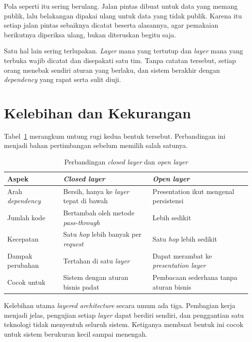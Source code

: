 Pola seperti itu sering berulang. Jalan pintas dibuat untuk data yang memang
publik, lalu belakangan dipakai ulang untuk data yang tidak publik. Karena itu
setiap jalan pintas sebaiknya dicatat beserta alasannya, agar pemakaian
berikutnya diperiksa ulang, bukan diteruskan begitu saja.


Satu hal lain sering terlupakan. \textit{Layer} mana yang tertutup dan \textit{layer} mana
yang terbuka wajib dicatat dan disepakati satu tim. Tanpa catatan tersebut,
setiap orang menebak sendiri aturan yang berlaku, dan sistem berakhir dengan
\textit{dependency} yang rapat serta sulit diuji.

\section{Kelebihan dan Kekurangan}

Tabel~\ref{tab:untung-rugi} merangkum untung rugi kedua bentuk tersebut.
Perbandingan ini menjadi bahan pertimbangan sebelum memilih salah satunya.

\begin{table}[htbp]
  \centering
  \caption{Perbandingan \textit{closed layer} dan \textit{open layer}}
  \label{tab:untung-rugi}
  \begin{tabularx}{\textwidth}{|l|X|X|}
    \hline
    \textbf{Aspek} & \textbf{\textit{Closed layer}} & \textbf{\textit{Open layer}} \\
    \hline
    Arah \textit{dependency} & Bersih, hanya ke \textit{layer} tepat di bawah & Presentation ikut mengenal persistensi \\
    \hline
    Jumlah kode & Bertambah oleh metode \textit{pass-through} & Lebih sedikit \\
    \hline
    Kecepatan & Satu \textit{hop} lebih banyak per \textit{request} & Satu \textit{hop} lebih sedikit \\
    \hline
    Dampak perubahan & Tertahan di satu \textit{layer} & Dapat merambat ke \textit{presentation layer} \\
    \hline
    Cocok untuk & Sistem dengan aturan bisnis padat & Pembacaan sederhana tanpa aturan bisnis \\
    \hline
  \end{tabularx}
\end{table}

Kelebihan utama \textit{layered architecture} secara umum ada tiga. Pembagian
kerja menjadi jelas, pengujian setiap \textit{layer} dapat berdiri sendiri, dan
penggantian satu teknologi tidak menyentuh seluruh sistem. Ketiganya membuat
bentuk ini cocok untuk sistem berukuran kecil sampai menengah.

